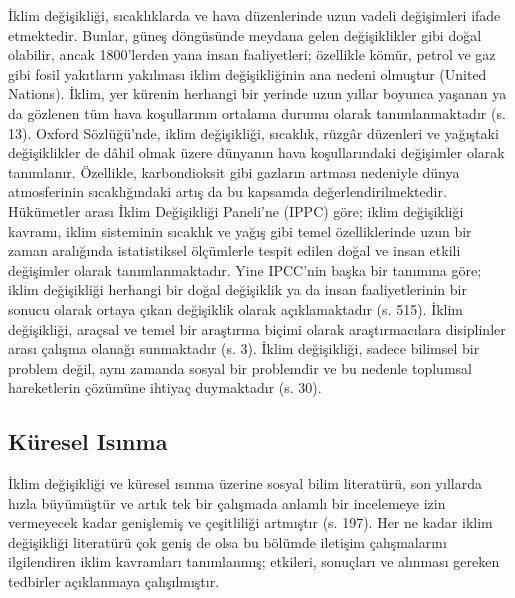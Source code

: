 \documentclass[
]{book}
\begin{document}
İklim değişikliği, sıcaklıklarda ve hava düzenlerinde uzun vadeli değişimleri ifade etmektedir. Bunlar, güneş döngüsünde meydana gelen değişiklikler gibi doğal olabilir, ancak 1800'lerden yana insan faaliyetleri; özellikle kömür, petrol ve gaz gibi fosil yakıtların yakılması iklim değişikliğinin ana nedeni olmuştur (United Nations). İklim, yer kürenin herhangi bir yerinde uzun yıllar boyunca yaşanan ya da gözlenen tüm hava koşullarının ortalama durumu olarak tanımlanmaktadır (s. 13). \citep{basucurehberi2008} Oxford Sözlüğü'nde, iklim değişikliği, sıcaklık, rüzgâr düzenleri ve yağıştaki değişiklikler de dâhil olmak üzere dünyanın hava koşullarındaki değişimler olarak tanımlanır. \citep{oxfordlearnersdict_climatechange} Özellikle, karbondioksit gibi gazların artması nedeniyle dünya atmosferinin sıcaklığındaki artış da bu kapsamda değerlendirilmektedir. Hükümetler arası İklim Değişikliği Paneli'ne (IPPC) göre; iklim değişikliği kavramı, iklim sisteminin sıcaklık ve yağış gibi temel özelliklerinde uzun bir zaman aralığında istatistiksel ölçümlerle tespit edilen doğal ve insan etkili değişimler olarak tanımlanmaktadır. \citep{dogan2011kuresel} Yine IPCC'nin başka bir tanımına göre; iklim değişikliği herhangi bir doğal değişiklik ya da insan faaliyetlerinin bir sonucu olarak ortaya çıkan değişiklik olarak açıklamaktadır (s. 515). \citep{pielke2004what} İklim değişikliği, araçsal ve temel bir araştırma biçimi olarak araştırmacılara disiplinler arası çalışma olanağı sunmaktadır (s. 3). \citep{serrao2018science} İklim değişikliği, sadece bilimsel bir problem değil, aynı zamanda sosyal bir problemdir ve bu nedenle toplumsal hareketlerin çözümüne ihtiyaç duymaktadır (s. 30). \citep{hansen2016communicating}

\hypertarget{kuxfcresel-isux131nma}{%
\subsection{Küresel Isınma}\label{kuxfcresel-isux131nma}}

İklim değişikliği ve küresel ısınma üzerine sosyal bilim literatürü, son yıllarda hızla büyümüştür ve artık tek bir çalışmada anlamlı bir incelemeye izin vermeyecek kadar genişlemiş ve çeşitliliği artmıştır (s. 197). \citep{mcadam2017social} Her ne kadar iklim değişikliği literatürü çok geniş de olsa bu bölümde iletişim çalışmalarını ilgilendiren iklim kavramları tanımlanmış; etkileri, sonuçları ve alınması gereken tedbirler açıklanmaya çalışılmıştır.
\end{document}
